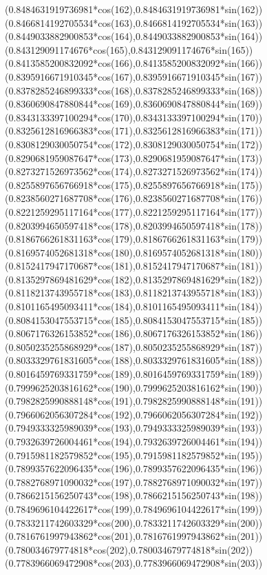 {({0.8484631919736981*cos(162)},{0.8484631919736981*sin(162)})
({0.8466814192705534*cos(163)},{0.8466814192705534*sin(163)})
({0.8449033882900853*cos(164)},{0.8449033882900853*sin(164)})
({0.843129091174676*cos(165)},{0.843129091174676*sin(165)})
({0.8413585200832092*cos(166)},{0.8413585200832092*sin(166)})
({0.8395916671910345*cos(167)},{0.8395916671910345*sin(167)})
({0.8378285246899333*cos(168)},{0.8378285246899333*sin(168)})
({0.8360690847880844*cos(169)},{0.8360690847880844*sin(169)})
({0.8343133397100294*cos(170)},{0.8343133397100294*sin(170)})
({0.8325612816966383*cos(171)},{0.8325612816966383*sin(171)})
({0.8308129030050754*cos(172)},{0.8308129030050754*sin(172)})
({0.8290681959087647*cos(173)},{0.8290681959087647*sin(173)})
({0.8273271526973562*cos(174)},{0.8273271526973562*sin(174)})
({0.8255897656766918*cos(175)},{0.8255897656766918*sin(175)})
({0.8238560271687708*cos(176)},{0.8238560271687708*sin(176)})
({0.8221259295117164*cos(177)},{0.8221259295117164*sin(177)})
({0.8203994650597418*cos(178)},{0.8203994650597418*sin(178)})
({0.8186766261831163*cos(179)},{0.8186766261831163*sin(179)})
({0.8169574052681318*cos(180)},{0.8169574052681318*sin(180)})
({0.8152417947170687*cos(181)},{0.8152417947170687*sin(181)})
({0.8135297869481629*cos(182)},{0.8135297869481629*sin(182)})
({0.8118213743955718*cos(183)},{0.8118213743955718*sin(183)})
({0.8101165495093411*cos(184)},{0.8101165495093411*sin(184)})
({0.8084153047553715*cos(185)},{0.8084153047553715*sin(185)})
({0.8067176326153852*cos(186)},{0.8067176326153852*sin(186)})
({0.8050235255868929*cos(187)},{0.8050235255868929*sin(187)})
({0.8033329761831605*cos(188)},{0.8033329761831605*sin(188)})
({0.8016459769331759*cos(189)},{0.8016459769331759*sin(189)})
({0.7999625203816162*cos(190)},{0.7999625203816162*sin(190)})
({0.7982825990888148*cos(191)},{0.7982825990888148*sin(191)})
({0.7966062056307284*cos(192)},{0.7966062056307284*sin(192)})
({0.7949333325989039*cos(193)},{0.7949333325989039*sin(193)})
({0.7932639726004461*cos(194)},{0.7932639726004461*sin(194)})
({0.7915981182579852*cos(195)},{0.7915981182579852*sin(195)})
({0.7899357622096435*cos(196)},{0.7899357622096435*sin(196)})
({0.7882768971090032*cos(197)},{0.7882768971090032*sin(197)})
({0.7866215156250743*cos(198)},{0.7866215156250743*sin(198)})
({0.7849696104422617*cos(199)},{0.7849696104422617*sin(199)})
({0.7833211742603329*cos(200)},{0.7833211742603329*sin(200)})
({0.7816761997943862*cos(201)},{0.7816761997943862*sin(201)})
({0.780034679774818*cos(202)},{0.780034679774818*sin(202)})
({0.7783966069472908*cos(203)},{0.7783966069472908*sin(203)})
}
